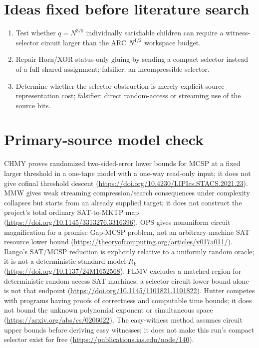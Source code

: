 \documentclass[11pt]{article}
\begin{document}
\section*{Ideas fixed before literature search}
\begin{enumerate}
\item Test whether $q=N^{3/5}$ individually satisfiable children can require a
  witness-selector circuit larger than the ARC $N^{1/2}$ workspace budget.
\item Repair Horn/XOR status-only gluing by sending a compact selector instead
  of a full shared assignment; falsifier: an incompressible selector.
\item Determine whether the selector obstruction is merely explicit-source
  representation cost; falsifier: direct random-access or streaming use of the
  source bits.
\end{enumerate}

\section*{Primary-source model check}
CHMY proves randomized two-sided-error lower bounds for MCSP at a fixed larger
threshold in a one-tape model with a one-way read-only input; it does not give
cofinal threshold descent
(\url{https://doi.org/10.4230/LIPIcs.STACS.2021.23}).
MMW gives weak streaming compression/search consequences under complexity
collapses but starts from an already supplied target; it does not construct the
project's total ordinary SAT-to-MKTP map
(\url{https://doi.org/10.1145/3313276.3316396}).
OPS gives nonuniform circuit magnification for a promise Gap-MCSP problem, not
an arbitrary-machine SAT resource lower bound
(\url{https://theoryofcomputing.org/articles/v017a011/}).
Ilango's SAT/MCSP reduction is explicitly relative to a uniformly random oracle;
it is not a deterministic standard-model $R_k$
(\url{https://doi.org/10.1137/24M1652568}).
FLMV excludes a matched region for deterministic random-access SAT machines; a
selector circuit lower bound alone is not that endpoint
(\url{https://doi.org/10.1145/1101821.1101822}).
Hutter competes with programs having proofs of correctness and computable time
bounds; it does not bound the unknown polynomial exponent or simultaneous
space (\url{https://arxiv.org/abs/cs/0206022}).
The easy-witness method assumes circuit upper bounds before deriving easy
witnesses; it does not make this run's compact selector exist for free
(\url{https://publications.ias.edu/node/140}).
\end{document}
